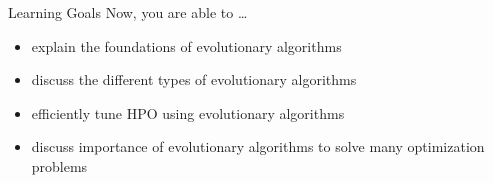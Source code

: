 \begin{frame}[c]{Learning Goals}
Now, you are able to \ldots

\begin{itemize}
	\item explain the foundations of \alert{evolutionary algorithms}
	\item discuss the \alert{different types of evolutionary algorithms}
	\item efficiently tune \alert{HPO using evolutionary algorithms}
	\item discuss importance of \alert{evolutionary algorithms to solve many optimization problems}
\end{itemize}
\end{frame}


